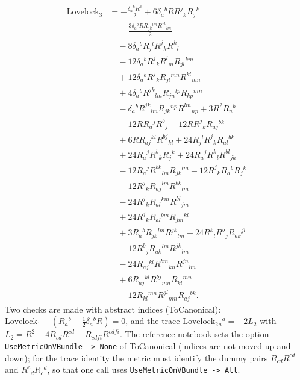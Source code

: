 \documentclass[10pt,a4paper]{article}
\begin{document}
\begin{align*}
\mathrm{Lovelock}_{3}&=- \frac{\delta_{a}{}^{b} R^{3}}{2} + 6 \delta_{a}{}^{b} R R^{j}{}_{k} R_{j}{}^{k} \\
&\quad - \frac{3 \delta_{a}{}^{b} R R_{jk}{}^{lm} R^{jk}{}_{lm}}{2} \\
&\quad - 8 \delta_{a}{}^{b} R_{j}{}^{l} R^{j}{}_{k} R^{k}{}_{l} \\
&\quad - 12 \delta_{a}{}^{b} R^{j}{}_{k} R^{l}{}_{m} R_{jl}{}^{km} \\
&\quad + 12 \delta_{a}{}^{b} R^{j}{}_{k} R_{jl}{}^{mn} R^{kl}{}_{mn} \\
&\quad + 4 \delta_{a}{}^{b} R^{jk}{}_{lm} R_{jn}{}^{lp} R_{kp}{}^{mn} \\
&\quad - \delta_{a}{}^{b} R^{jk}{}_{lm} R_{jk}{}^{np} R^{lm}{}_{np} + 3 R^{2} R_{a}{}^{b} \\
&\quad - 12 R R_{a}{}^{j} R^{b}{}_{j} - 12 R R^{j}{}_{k} R_{aj}{}^{bk} \\
&\quad + 6 R R_{aj}{}^{kl} R^{bj}{}_{kl} + 24 R_{j}{}^{l} R^{j}{}_{k} R_{al}{}^{bk} \\
&\quad + 24 R_{a}{}^{j} R^{b}{}_{k} R_{j}{}^{k} + 24 R_{a}{}^{j} R^{k}{}_{l} R^{bl}{}_{jk} \\
&\quad - 12 R_{a}{}^{j} R^{bk}{}_{lm} R_{jk}{}^{lm} - 12 R^{j}{}_{k} R_{a}{}^{b} R_{j}{}^{k} \\
&\quad - 12 R^{j}{}_{k} R_{aj}{}^{lm} R^{bk}{}_{lm} \\
&\quad - 24 R^{j}{}_{k} R_{al}{}^{km} R^{bl}{}_{jm} \\
&\quad + 24 R^{j}{}_{k} R_{al}{}^{bm} R_{jm}{}^{kl} \\
&\quad + 3 R_{a}{}^{b} R_{jk}{}^{lm} R^{jk}{}_{lm} + 24 R^{k}{}_{l} R^{b}{}_{j} R_{ak}{}^{jl} \\
&\quad - 12 R^{b}{}_{j} R_{ak}{}^{lm} R^{jk}{}_{lm} \\
&\quad - 24 R_{aj}{}^{kl} R^{bm}{}_{kn} R^{jn}{}_{lm} \\
&\quad + 6 R_{aj}{}^{kl} R^{bj}{}_{mn} R_{kl}{}^{mn} \\
&\quad - 12 R_{kl}{}^{mn} R^{jl}{}_{mn} R_{aj}{}^{bk}.
\end{align*}
Two checks are made with abstract indices (ToCanonical): $\mathrm{Lovelock}_1-(R_a{}^b-\tfrac12\delta_a{}^bR)=0$, and the trace $\mathrm{Lovelock}_2{}_a{}^a=-2L_2$ with $L_2=R^2-4R_{cd}R^{cd}+R_{cdfi}R^{cdfi}$. The reference notebook sets the option \texttt{UseMetricOnVBundle -> None} of ToCanonical (indices are not moved up and down); for the trace identity the metric must identify the dummy pairs $R_{cd}R^{cd}$ and $R^c{}_dR_c{}^d$, so that one call uses \texttt{UseMetricOnVBundle -> All}.
\end{document}
